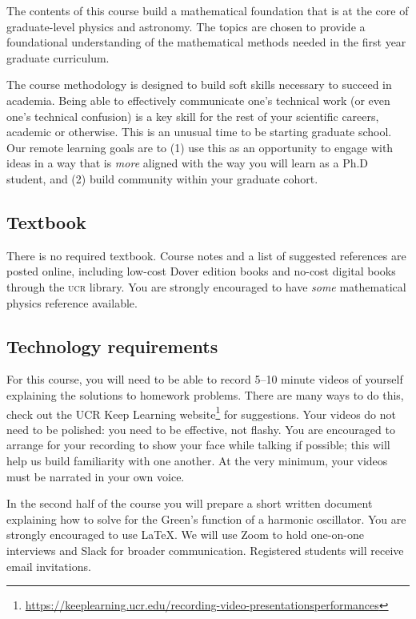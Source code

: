 \documentclass[12pt]{article}
\numberwithin{equation}{section}    %
\begin{document}
The contents of this course build a mathematical foundation that is at the core of graduate-level physics and astronomy. The topics are chosen to provide a foundational understanding of the mathematical methods needed in the first year graduate curriculum.

The course methodology is designed to build soft skills necessary to succeed in academia. Being able to effectively communicate one's technical work (or even one's technical confusion) is a key skill for the rest of your scientific careers, academic or otherwise.
%
This is an unusual time to be starting graduate school. Our remote learning goals are to (1) use this as an opportunity to engage with ideas in a way that is \emph{more} aligned with the way you will learn as a Ph.D student, and (2) build community within your graduate cohort. 


\subsection*{Textbook}

There is no required textbook. Course notes and a list of suggested references are posted online, including low-cost Dover edition books and no-cost digital books through the \textsc{ucr} library. You are strongly encouraged to have \emph{some} mathematical physics reference available.

\subsection*{Technology requirements}

For this course, you will need to be able to record 5--10 minute videos of yourself explaining the solutions to homework problems. There are many ways to do this, check out the UCR Keep Learning website\footnote{\url{https://keeplearning.ucr.edu/recording-video-presentationsperformances}} for suggestions. Your videos do not need to be polished: you need to be effective, not flashy. You are encouraged to arrange for your recording to show your face while talking if possible; this will help us build familiarity with one another. At the very minimum, your videos must be narrated in your own voice. 

In the second half of the course you will prepare a short written document explaining how to solve for the Green's function of a harmonic oscillator. You are strongly encouraged to use \LaTeX. We will use Zoom to hold one-on-one interviews and Slack for broader communication.  Registered students will receive email invitations.
\end{document}
